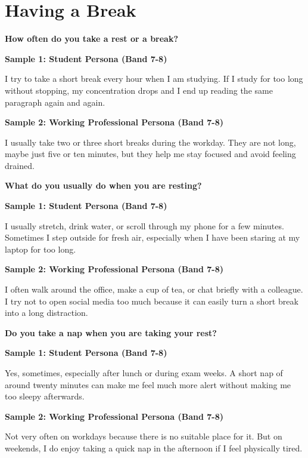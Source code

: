 \newpage

\section{Having a Break}
\begin{ieltsquestion}
\textbf{How often do you take a rest or a break?}
\end{ieltsquestion}
\textbf{Sample 1: Student Persona (Band 7-8)}

I try to take a short break every hour when I am studying. If I study for too long without stopping, my concentration drops and I end up reading the same paragraph again and again.

\textbf{Sample 2: Working Professional Persona (Band 7-8)}

I usually take two or three short breaks during the workday. They are not long, maybe just five or ten minutes, but they help me stay focused and avoid feeling drained.

\separator

\begin{ieltsquestion}
\textbf{What do you usually do when you are resting?}
\end{ieltsquestion}
\textbf{Sample 1: Student Persona (Band 7-8)}

I usually stretch, drink water, or scroll through my phone for a few minutes. Sometimes I step outside for fresh air, especially when I have been staring at my laptop for too long.

\textbf{Sample 2: Working Professional Persona (Band 7-8)}

I often walk around the office, make a cup of tea, or chat briefly with a colleague. I try not to open social media too much because it can easily turn a short break into a long distraction.

\separator

\begin{ieltsquestion}
\textbf{Do you take a nap when you are taking your rest?}
\end{ieltsquestion}
\textbf{Sample 1: Student Persona (Band 7-8)}

Yes, sometimes, especially after lunch or during exam weeks. A short nap of around twenty minutes can make me feel much more alert without making me too sleepy afterwards.

\textbf{Sample 2: Working Professional Persona (Band 7-8)}

Not very often on workdays because there is no suitable place for it. But on weekends, I do enjoy taking a quick nap in the afternoon if I feel physically tired.

